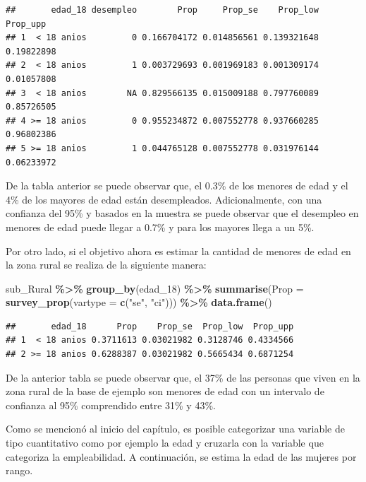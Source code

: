 \documentclass[
  spanish,
  12pt,
]{book}
\newenvironment{Shaded}{\begin{snugshade}}{\end{snugshade}}
\newcommand{\AttributeTok}[1]{\textcolor[rgb]{0.13,0.29,0.53}{#1}}
\newcommand{\FunctionTok}[1]{\textcolor[rgb]{0.13,0.29,0.53}{\textbf{#1}}}
\newcommand{\NormalTok}[1]{#1}
\newcommand{\SpecialCharTok}[1]{\textcolor[rgb]{0.81,0.36,0.00}{\textbf{#1}}}
\newcommand{\StringTok}[1]{\textcolor[rgb]{0.31,0.60,0.02}{#1}}
\begin{document}
\begin{verbatim}
##       edad_18 desempleo        Prop     Prop_se    Prop_low   Prop_upp
## 1  < 18 anios         0 0.166704172 0.014856561 0.139321648 0.19822898
## 2  < 18 anios         1 0.003729693 0.001969183 0.001309174 0.01057808
## 3  < 18 anios        NA 0.829566135 0.015009188 0.797760089 0.85726505
## 4 >= 18 anios         0 0.955234872 0.007552778 0.937660285 0.96802386
## 5 >= 18 anios         1 0.044765128 0.007552778 0.031976144 0.06233972
\end{verbatim}

De la tabla anterior se puede observar que, el 0.3\% de los menores de edad y el 4\% de los mayores de edad están desempleados. Adicionalmente, con una confianza del 95\% y basados en la muestra se puede observar que el desempleo en menores de edad puede llegar a 0.7\% y para los mayores llega a un 5\%.

Por otro lado, si el objetivo ahora es estimar la cantidad de menores de edad en la zona rural se realiza de la siguiente manera:

\begin{Shaded}
\begin{Highlighting}[]
\NormalTok{sub\_Rural }\SpecialCharTok{\%\textgreater{}\%} \FunctionTok{group\_by}\NormalTok{(edad\_18) }\SpecialCharTok{\%\textgreater{}\%} 
              \FunctionTok{summarise}\NormalTok{(}\AttributeTok{Prop =} \FunctionTok{survey\_prop}\NormalTok{(}\AttributeTok{vartype =}  \FunctionTok{c}\NormalTok{(}\StringTok{"se"}\NormalTok{, }\StringTok{"ci"}\NormalTok{))) }\SpecialCharTok{\%\textgreater{}\%}
              \FunctionTok{data.frame}\NormalTok{()}
\end{Highlighting}
\end{Shaded}

\begin{verbatim}
##       edad_18      Prop    Prop_se  Prop_low  Prop_upp
## 1  < 18 anios 0.3711613 0.03021982 0.3128746 0.4334566
## 2 >= 18 anios 0.6288387 0.03021982 0.5665434 0.6871254
\end{verbatim}

De la anterior tabla se puede observar que, el 37\% de las personas que viven en la zona rural de la base de ejemplo son menores de edad con un intervalo de confianza al 95\% comprendido entre 31\% y 43\%.

Como se mencionó al inicio del capítulo, es posible categorizar una variable de tipo cuantitativo como por ejemplo la edad y cruzarla con la variable que categoriza la empleabilidad. A continuación, se estima la edad de las mujeres por rango.
\end{document}
